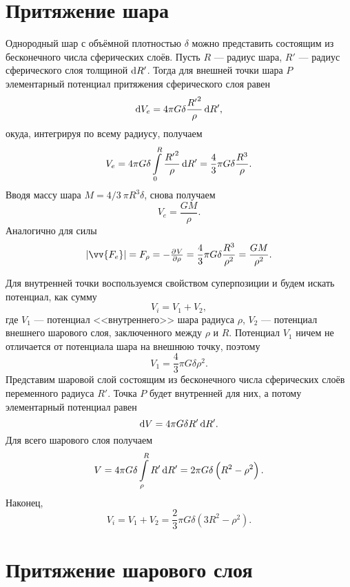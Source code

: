 \documentclass[11pt, a4paper]{article}
\theoremstyle{plain}
\theoremstyle{definition}
\theoremstyle{remark}
\begin{document}
\section{Притяжение шара}
Однородный шар с объёмной плотностью $\delta$ можно представить состоящим из бесконечного числа
сферических слоёв. Пусть $R$ --- радиус шара,
$R'$ --- радиус сферического слоя толщиной $\dif R'$. Тогда для внешней точки шара $P$ элементарный
потенциал притяжения сферического слоя равен
\begin{equation*}
    \dif V_e = 4\pi G\delta\dfrac{{R'}^2}{\rho}\dif R',
\end{equation*}
окуда, интегрируя по всему радиусу, получаем
\begin{equation*}
    V_e = 4\pi G\delta \int\limits_{0}^{R}\dfrac{{R'}^2}{\rho}\dif R' = 
    \dfrac{4}{3}\pi G\delta\dfrac{R^3}{\rho}.
\end{equation*}
Вводя массу шара $M = 4/3\ \pi R^3 \delta$, снова получаем
\begin{equation*}
    V_e = \dfrac{GM}{\rho}.
\end{equation*}
Аналогично для силы
\begin{equation*}
    |\vv{F_e}| = F_\rho = -\pd{V}{\rho} = \dfrac{4}{3}\pi G\delta \dfrac{R^3}{\rho^2} = 
    \dfrac{GM}{\rho^2}.
\end{equation*}

Для внутренней точки воспользуемся свойством суперпозиции и будем искать потенциал, как сумму
\begin{equation*}
    V_i = V_1 + V_2,
\end{equation*}
где $V_1$ --- потенциал <<внутреннего>> шара радиуса $\rho$, $V_2$ --- потенциал внешнего шарового
слоя, заключенного между $\rho$ и $R$. Потенциал $V_1$ ничем не отличается от потенциала шара на
внешнюю точку, поэтому
\begin{equation*}
    V_1 = \dfrac{4}{3}\pi G\delta\rho^2.
\end{equation*}
Представим шаровой слой состоящим из бесконечного числа сферических слоёв переменного радиуса $R'$.
Точка $P$ будет внутренней для них, а потому элементарный потенциал равен
\begin{equation*}
    \dif V = 4\pi G\delta R'\dif R'.
\end{equation*}
Для всего шарового слоя получаем
\begin{equation*}
    V = 4\pi G\delta \int\limits_{\rho}^{R} R'\dif R' = 2\pi G\delta \left( R^2 - \rho^2 \right).
\end{equation*}
Наконец,
\begin{equation*}
    V_i = V_1 + V_2 = \dfrac{2}{3}\pi G\delta \left( 3R^2 - \rho^2 \right).
\end{equation*}

\section{Притяжение шарового слоя}

\end{document}
